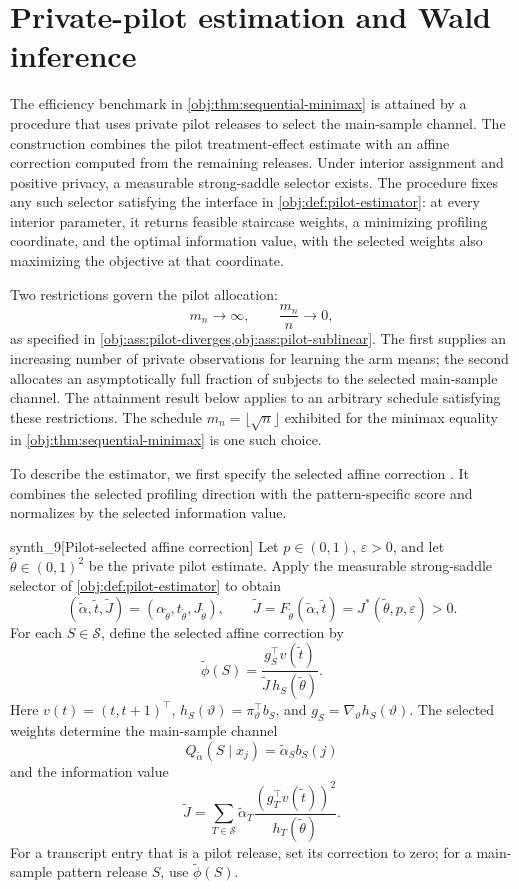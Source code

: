 \section{Private-pilot estimation and Wald inference}

The efficiency benchmark in \cref{obj:thm:sequential-minimax} is attained by a procedure that uses private pilot releases to select the main-sample channel. The construction combines the pilot treatment-effect estimate with an affine correction computed from the remaining releases. Under interior assignment and positive privacy, a measurable strong-saddle selector exists. The procedure fixes any such selector satisfying the interface in \cref{obj:def:pilot-estimator}: at every interior parameter, it returns feasible staircase weights, a minimizing profiling coordinate, and the optimal information value, with the selected weights also maximizing the objective at that coordinate.

Two restrictions govern the pilot allocation:
\[
m_n\longrightarrow\infty,
\qquad
\frac{m_n}{n}\longrightarrow0,
\]
as specified in \cref{obj:ass:pilot-diverges,obj:ass:pilot-sublinear}. The first supplies an increasing number of private observations for learning the arm means; the second allocates an asymptotically full fraction of subjects to the selected main-sample channel. The attainment result below applies to an arbitrary schedule satisfying these restrictions. The schedule \(m_n=\lfloor\sqrt n\rfloor\) exhibited for the minimax equality in \cref{obj:thm:sequential-minimax} is one such choice.

To describe the estimator, we first specify the selected affine correction . It combines the selected profiling direction with the pattern-specific score and normalizes by the selected information value.

\begin{definitionv}{synth_9}[Pilot-selected affine correction]
Let \(p\in(0,1)\), \(\varepsilon>0\), and let \(\widetilde\theta\in(0,1)^2\) be the private pilot estimate. Apply the measurable strong-saddle selector of \cref{obj:def:pilot-estimator} to obtain
\[
(\widetilde\alpha,\widetilde t,\widetilde J)
=(\alpha_{\widetilde\theta},t_{\widetilde\theta},J_{\widetilde\theta}),
\qquad
\widetilde J
=F_{\widetilde\theta}(\widetilde\alpha,\widetilde t)
=J^*(\widetilde\theta,p,\varepsilon)>0.
\]
For each \(S\in\mathcal S\), define the selected affine correction by
\[
\widetilde\phi(S)
=\frac{g_S^{\top}v(\widetilde t)}
       {\widetilde J\,h_S(\widetilde\theta)}.
\]
Here \(v(t)=(t,t+1)^{\top}\), \(h_S(\vartheta)=\pi_\vartheta^{\top}b_S\), and \(g_S=\nabla_\vartheta h_S(\vartheta)\). The selected weights determine the main-sample channel
\[
Q_{\widetilde\alpha}(S\mid x_j)=\widetilde\alpha_S b_S(j)
\]
and the information value
\[
\widetilde J
=\sum_{T\in\mathcal S}
\widetilde\alpha_T
\frac{(g_T^{\top}v(\widetilde t))^2}
     {h_T(\widetilde\theta)}.
\]
For a transcript entry that is a pilot release, set its correction to zero; for a main-sample pattern release \(S\), use \(\widetilde\phi(S)\).
\end{definitionv}

